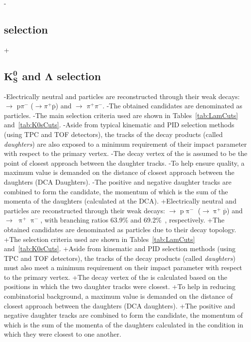 { 
-\subsection{\Vz selection}
+\subsection{$\mathbf{K^{0}_{S}}$ and $\boldsymbol{\Lambda}$ selection}
 \label{sec:V0Selection}
 
-Electrically neutral \LamALam and \Ks particles are reconstructed through their weak decays: \Lam $\rightarrow$ p$\pi^{-}$ (\ALam $\rightarrow \pi^{+}\overline{\mathrm{p}}$) and \Ks $\rightarrow$ $\pi^{+}\pi^{-}$.
-The obtained candidates are denominated as \Vz particles.
-The main selection criteria used are shown in Tables~\ref{tab:LamCuts} and~\ref{tab:K0sCuts}.
-Aside from typical kinematic and PID selection methods (using TPC and TOF detectors), the tracks of the decay products (called \textit{daughters}) are also exposed to a minimum requirement of their impact parameter with respect to the primary vertex.  
-The decay vertex of the \Vz is assumed to be the point of closest approach between the daughter tracks.
-To help ensure quality, a maximum value is demanded on the distance of closest approach between the daughters (DCA \Vz Daughters).
-The positive and negative daughter tracks are combined to form the \Vz candidate, the momentum of which is the sum of the momenta of the daughters (calculated at the DCA).
+Electrically neutral \LamALam and \Ks particles are reconstructed through their weak decays: \Lam $\rightarrow$ p$\uppi^{-}$ (\ALam $\rightarrow \uppi^{+}\overline{\mathrm{p}}$) and \Ks $\rightarrow$ $\uppi^{+}\uppi^{-}$, with branching ratios 63.9\% and 69.2\%~\cite{PhysRevD.98.030001}, respectively.
+The obtained candidates are denominated as \Vz particles due to their decay topology.
+The selection criteria used are shown in Tables~\ref{tab:LamCuts} and~\ref{tab:K0sCuts}.
+Aside from kinematic and PID selection methods (using TPC and TOF detectors), the tracks of the decay products (called \textit{daughters}) must also meet a minimum requirement on their impact parameter with respect to the primary vertex.  
+The decay vertex of the \Vz is calculated based on the positions in which the two daughter tracks were closest.
+To help in reducing combinatorial background, a maximum value is demanded on the distance of closest approach between the daughters (DCA \Vz daughters).
+The positive and negative daughter tracks are combined to form the \Vz candidate, the momentum of which is the sum of the momenta of the daughters calculated in the condition in which they were closest to one another.
 
}
